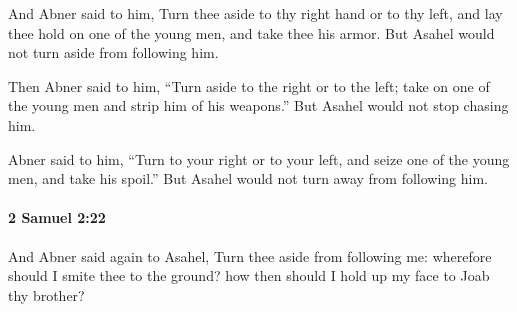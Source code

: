 			\begin{versebox}
					\item[BHS] 
					\item[ASV] And Abner said to him, Turn thee aside to thy right hand or to thy left, and lay thee hold on one of the young men, and take thee his armor. But Asahel would not turn aside from following him.
					\item[NIV] Then Abner said to him, “Turn aside to the right or to the left; take on one of the young men and strip him of his weapons.” But Asahel would not stop chasing him.
					\item[NRSV] Abner said to him, “Turn to your right or to your left, and seize one of the young men, and take his spoil.” But Asahel would not turn away from following him.
			\end{versebox}

		\paragraph{2 Samuel 2:22} %
			\label{2SAMUEL-2-22}

			And Abner said again to Asahel, Turn thee aside from following me: wherefore should I smite thee to the ground? how then should I hold up my face to Joab thy brother?

